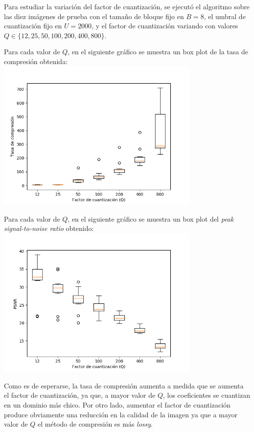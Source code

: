 \documentclass{article}
\newcommand{\set}[1]{\{#1\}}
\begin{document}
Para estudiar la variación del factor de cuantización, se ejecutó el
algoritmo sobre las diez imágenes de prueba con el
tamaño de bloque fijo en $B = 8$,
el umbral de cuantización fijo en $U = 2000$,
y el factor de cuantización variando con valores
$Q \in \set{12,25,50,100,200,400,800}$.

Para cada valor de $Q$, en el siguiente gráfico se muestra un
box plot de la tasa de compresión obtenida:\\
\includegraphics[width=10cm]{../imgs/output/gray_plots/q_rate.png}

Para cada valor de $Q$, en el siguiente gráfico se muestra un
box plot del {\em peak signal-to-noise ratio} obtenido:\\
\includegraphics[width=10cm]{../imgs/output/gray_plots/q_psnr.png}

Como es de esperarse, la tasa de compresión aumenta a medida que
se aumenta el factor de cuantización, ya que, a mayor valor de $Q$,
los coeficientes se cuantizan en un dominio más chico.
Por otro lado, aumentar el factor de cuantización produce obviamente
una reducción en la calidad de la imagen ya que a mayor valor de $Q$
el método de compresión es más {\em lossy}.
\end{document}
